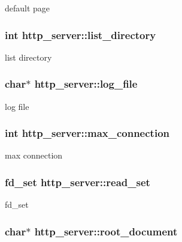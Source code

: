 \label{structhttp__server_ab91aa6ac27175544a71f89764137ace9}
default page \hypertarget{structhttp__server_a6861735a5369b0f870027098e6a45add}{
\subsubsection[{list\_\-directory}]{\setlength{\rightskip}{0pt plus 5cm}int {\bf http\_\-server::list\_\-directory}}}
\label{structhttp__server_a6861735a5369b0f870027098e6a45add}
list directory \hypertarget{structhttp__server_aa0f74d26cdfb2eb7bd3160e29d3a1cd3}{
\subsubsection[{log\_\-file}]{\setlength{\rightskip}{0pt plus 5cm}char$\ast$ {\bf http\_\-server::log\_\-file}}}
\label{structhttp__server_aa0f74d26cdfb2eb7bd3160e29d3a1cd3}
log file \hypertarget{structhttp__server_a604db1118f08a81a5c7af5292ceafbae}{
\subsubsection[{max\_\-connection}]{\setlength{\rightskip}{0pt plus 5cm}int {\bf http\_\-server::max\_\-connection}}}
\label{structhttp__server_a604db1118f08a81a5c7af5292ceafbae}
max connection \hypertarget{structhttp__server_a0ef8e756d2761544802490883444ea7e}{
\subsubsection[{read\_\-set}]{\setlength{\rightskip}{0pt plus 5cm}fd\_\-set {\bf http\_\-server::read\_\-set}}}
\label{structhttp__server_a0ef8e756d2761544802490883444ea7e}
fd\_\-set \hypertarget{structhttp__server_a25d2bb352f5d3fdd09ce7fbe266f6aac}{
\subsubsection[{root\_\-document}]{\setlength{\rightskip}{0pt plus 5cm}char$\ast$ {\bf http\_\-server::root\_\-document}}}
